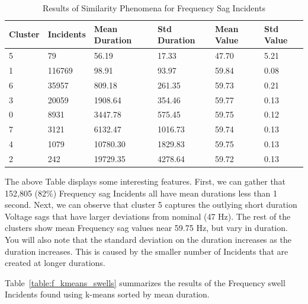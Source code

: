 \begin{table}[H]
    \centering
    \caption{Results of Similarity Phenomena for Frequency Sag Incidents}
    \begin{tabularx}{\textwidth}{llllll}
        \toprule
        \textbf{Cluster} & \textbf{Incidents} &\textbf{Mean Duration} & \textbf{Std Duration} & \textbf{Mean Value} & \textbf{Std Value} \\
        \midrule
        5 & 79 & 56.19 & 17.33 & 47.70 & 5.21 \\
        1 & 116769 & 98.91 & 93.97 & 59.84 & 0.08 \\
        6 & 35957 & 809.18 & 261.35 & 59.73 & 0.21 \\
        3 & 20059 & 1908.64 & 354.46 & 59.77 & 0.13 \\
        0 & 8931 & 3447.78 & 575.45 & 59.75 & 0.12 \\
        7 & 3121 & 6132.47 & 1016.73 & 59.74 & 0.13 \\
        4 & 1079 & 10780.30 & 1829.83 & 59.75 & 0.13 \\
        2 & 242 & 19729.35 & 4278.64 & 59.72 & 0.13 \\
        \bottomrule
    \end{tabularx}
    \label{table:f_kmeans_sags}
\end{table}

The above Table displays some interesting features. First, we can gather that 152,805 (82\%) Frequency sag Incidents all have mean durations less than 1 second. Next, we can observe that cluster 5 captures the outlying short duration Voltage sags that have larger deviations from nominal (47 Hz). The rest of the clusters show mean Frequency sag values near 59.75 Hz, but vary in duration. You will also note that the standard deviation on the duration increases as the duration increases. This is caused by the smaller number of Incidents that are created at longer durations.

Table~\ref{table:f_kmeans_swells} summarizes the results of the Frequency swell Incidents found using k-means sorted by mean duration.

